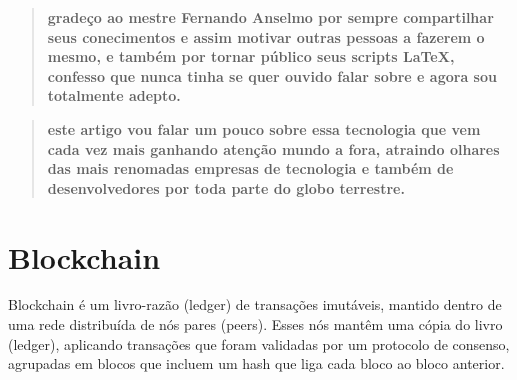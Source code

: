 \documentclass[a4paper,11pt]{article}
\begin{document}
	
\maketitle %
\thispagestyle{fancy} %

\renewcommand{\abstractname}{Agradecimentos}
\begin{abstract}
  \textbf{gradeço ao mestre Fernando Anselmo\cite{fernandoanselmo,credito, publicacaofernando} por sempre compartilhar seus conecimentos e assim motivar outras pessoas a fazerem o mesmo, e também por tornar público seus scripts LaTeX\cite{latex}, confesso que nunca tinha se quer ouvido falar sobre e agora sou totalmente adepto.}
\end{abstract}

\renewcommand{\abstractname}{Resumo}
\begin{abstract}
  \textbf{este artigo vou falar um pouco sobre essa tecnologia que vem cada vez mais ganhando atenção mundo a fora, atraindo olhares das mais renomadas empresas de tecnologia e também de desenvolvedores por toda parte do globo terrestre.}
\end{abstract}

\section{Blockchain}
Blockchain é um livro-razão (ledger) de transações imutáveis, mantido dentro de uma rede distribuída de nós pares (peers). Esses nós mantêm uma cópia do livro (ledger), aplicando transações que foram validadas por um protocolo de consenso, agrupadas em blocos que incluem um hash que liga cada bloco ao bloco anterior.
\end{document}

